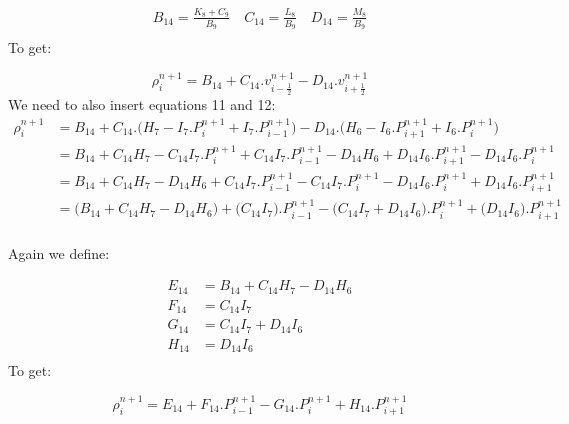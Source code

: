 \documentclass[11pt,letterpaper,titlepage]{article}
\newcommand{\half}{\frac{1}{2}}
\begin{document}
\begin{equation*}
\begin{aligned}
B_{14} =  \frac{K_8+C_9}{B_9} \quad
C_{14} =   \frac{L_8}{B_9}  \quad
D_{14} =   \frac{M_8}{B_9}  \\
\end{aligned}
\end{equation*}
\newline
To get:

\begin{equation*}
\rho_{i}^{n+1}=B_{14}+C_{14}.v_{i-\half}^{n+1}-D_{14}.v_{i+\half}^{n+1}
\end{equation*}
\newline
We need to also insert equations 11 and 12:
\begin{equation*}
\begin{aligned}
\rho_{i}^{n+1}&=B_{14}+C_{14}.\biggr( H_7-I_7.P_{i}^{n+1}+I_7.P_{i-1}^{n+1}  \biggr)-D_{14}.\biggr( H_6-I_6.P_{i+1}^{n+1}+I_6.P_{i}^{n+1}   \biggr) \\
              &=B_{14}+C_{14} H_7 - C_{14} I_7.P_{i}^{n+1} + C_{14} I_7.P_{i-1}^{n+1} - D_{14} H_6 + D_{14} I_6.P_{i+1}^{n+1} - D_{14} I_6.P_{i}^{n+1} \\
              &=B_{14}+C_{14} H_7 - D_{14} H_6 + C_{14} I_7.P_{i-1}^{n+1} - C_{14} I_7.P_{i}^{n+1} - D_{14} I_6.P_{i}^{n+1} + D_{14} I_6.P_{i+1}^{n+1} \\
              &=\biggr( B_{14}+C_{14} H_7 - D_{14} H_6 \biggr) + \biggr( C_{14} I_7 \biggr).P_{i-1}^{n+1} - \biggr(C_{14} I_7 + D_{14} I_6 \biggr).P_{i}^{n+1} + \biggr( D_{14} I_6 \biggr).P_{i+1}^{n+1} \\
\end{aligned}
\end{equation*}


Again we define:

\begin{equation*}
\begin{aligned}
E_{14} &=  B_{14}+C_{14} H_7 - D_{14} H_6  \\
F_{14} &=  C_{14} I_7    \\
G_{14} &=  C_{14} I_7 + D_{14} I_6  \\
H_{14} &=  D_{14} I_6  \\
\end{aligned}
\end{equation*}
\newline
To get:

\begin{equation}
\rho_{i}^{n+1}=E_{14} +F_{14}.P_{i-1}^{n+1} - G_{14}.P_{i}^{n+1} + H_{14}.P_{i+1}^{n+1}
\end{equation}
\newline
\end{document}
